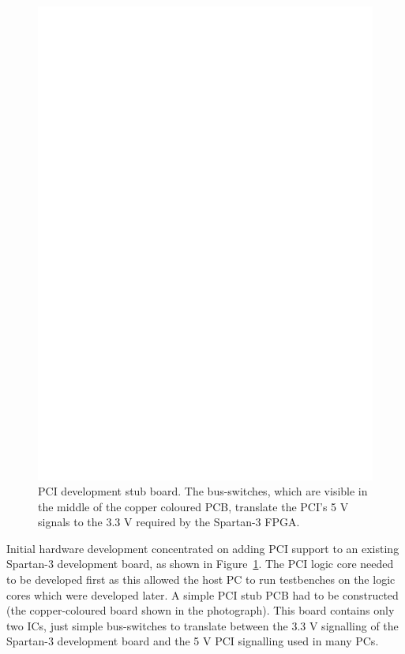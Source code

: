 \begin{figure}[h]
\begin{center}
\includegraphics[width=\linewidth]{images/pci_stub.eps}
\caption[PCI development stub board]{PCI development stub board. The
bus-switches, which are visible in the middle of the copper coloured PCB,
translate the PCI's 5 V signals to the 3.3 V required by the Spartan-3 FPGA.}
\label{OPENVGA_PCI_Stub}
\end{center}
\end{figure}

Initial hardware development concentrated on adding PCI support to an existing
Spartan-3 development board, as shown in Figure~\ref{OPENVGA_PCI_Stub}. The PCI
logic core needed to be developed first as this allowed the host PC to run
testbenches on the logic cores which were developed later. A simple PCI stub PCB
had to be constructed (the copper-coloured board shown in the photograph). This
board contains only two ICs, just simple bus-switches to translate between the
3.3 V signalling of the Spartan-3 development board and the 5 V PCI signalling
used in many PCs.

